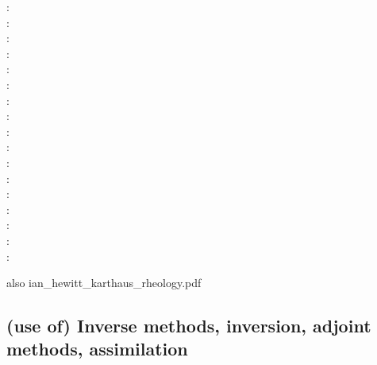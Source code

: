 \begin{scriptsize}
\nineteeneightynine: \cite{buja89}\\
\nineteenninety: \cite{vawh90}\\
\nineteenninetyfour: \cite{wizh94}\\
\nineteenninetyseven: \cite{grev97}\\
\twothousandone: \cite{goko01}\\
\twothousandfour: \cite{frmm04}\\
\twothousandsix: \cite{asbl06}\cite{frmm06}\\
\twothousandseven: \cite{susp07}\cite{zwgg07}\\
\twothousandeleven: \cite{zhjg11}\\
\twothousandtwelve: \cite{pode12}\\
\twothousandthirteen: \cite{raab13}\\
\twothousandfourteen: \cite{lejx14}\cite{moad14}\\
\twothousandfifteen: \cite{issg15}\cite{frlg15}\\
\twothousandsixteen: \cite{krab16}\cite{daws16}\\
\twothousandseventeen: \cite{lolc17}\cite{gors17}\\
\twothousandeighteen: \cite{heah18}\cite{mimr18}\\
\twothousandnineteen: \cite{kudd19}\cite{kuwd19}\cite{kuiper19}
\end{scriptsize}


also ian\_hewitt\_karthaus\_rheology.pdf

\subsection{(use of) Inverse methods, inversion, adjoint methods, assimilation}

